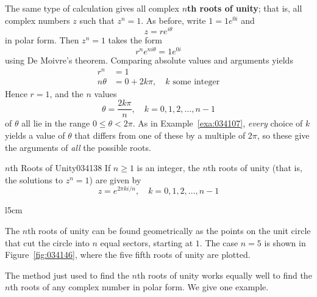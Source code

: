 The same type of calculation gives all complex $n$\textbf{th roots of unity}; that is, all complex numbers $z$ such that $z^n = 1$. As before, write $1 = 1e^{0i}$ and
\begin{equation*}
z = re^{i\theta}
\end{equation*}
in polar form. Then $z^n = 1$ takes the form
\begin{equation*}
r^ne^{ni\theta} = 1e^{0i}
\end{equation*}
using De Moivre's theorem. Comparing absolute values and arguments yields
\begin{align*}
r^n &= 1 \\
n\theta & = 0 + 2k\pi, \quad k \mbox{ some integer}
\end{align*}
Hence $r = 1$, and the $n$ values
\begin{equation*}
\theta = \frac{2k\pi}{n}, \quad k=0, 1, 2, \dots, n-1
\end{equation*}
of $\theta$ all lie in the range $0 \leq \theta < 2\pi$. As in Example~\ref{exa:034107}, \textit{every} choice of $k$ yields a value of $\theta$ that differs from one of these by a multiple of $2\pi$, so these give the arguments of \textit{all} the possible roots.


\begin{theorem}{$n$th Roots of Unity}{034138}
If $n \geq 1$ is an integer, the $n$th roots of unity (that is, the solutions to $z^n = 1$) are given by
\begin{equation*}
z = e^{2\pi ki/n}, \quad k = 0, 1, 2, \dots, n-1
\end{equation*}
\vspace*{-2em}
\end{theorem}

\begin{wrapfigure}[6]{l}{5cm}
        \vspace*{-1em}
	\centering
	
	\caption{\label{fig:034146}}
\end{wrapfigure}

\noindent The $n$th roots of unity can be found geometrically as the points on the unit circle that cut the circle into $n$ equal sectors, starting at $1$. The case $n = 5$ is shown in Figure~\ref{fig:034146}, where the five fifth roots of unity are plotted.

\vspace{2em}

The method just used to find the $n$th roots of unity works equally well to find the $n$th roots of any complex number in polar form. We give one example.

